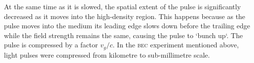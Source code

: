     At the same time as it is slowed, the spatial extent of the pulse is
    significantly decreased as it moves into the high-density region. This
    happens because as the pulse moves into the medium its leading edge slows
    down before the trailing edge while the field strength remains the same,
    causing the pulse to `bunch up`. The pulse is compressed by a factor
    $v_g/c$.\cite{Hau1999} In the \textsc{bec} experiment mentioned above, light
    pulses were compressed from kilometre to sub-millimetre scale.





